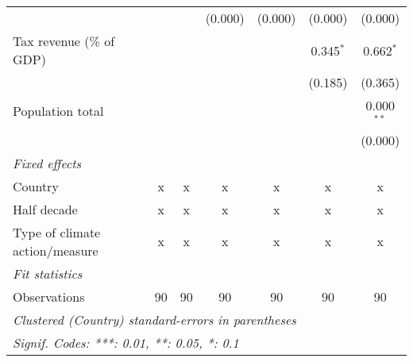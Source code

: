 \begin{tabular}{lcccccc}
                                                     &                   &                    & (0.000)            & (0.000)            & (0.000)            & (0.000)\\   
   Tax revenue (\% of GDP)                           &                   &                    &                    &                    & 0.345$^{*}$        & 0.662$^{*}$\\   
                                                     &                   &                    &                    &                    & (0.185)            & (0.365)\\   
   Population total                                  &                   &                    &                    &                    &                    & 0.000$^{**}$\\   
                                                     &                   &                    &                    &                    &                    & (0.000)\\   
   \emph{Fixed effects}\\
   Country                                           & x                 & x                  & x                  & x                  & x                  & x\\  
   Half decade                                       & x                 & x                  & x                  & x                  & x                  & x\\  
   Type of climate action/measure                    & x                 & x                  & x                  & x                  & x                  & x\\  
   \midrule \emph{Fit statistics}\\
   Observations                                      & 90                & 90                 & 90                 & 90                 & 90                 & 90\\  
   \midrule
   \multicolumn{7}{l}{\emph{Clustered (Country) standard-errors in parentheses}}\\
   \multicolumn{7}{l}{\emph{Signif. Codes: ***: 0.01, **: 0.05, *: 0.1}}\\
\end{tabular}
\par\endgroup


